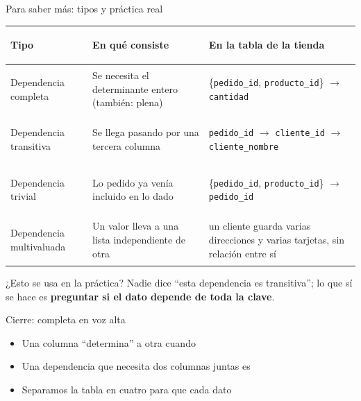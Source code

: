 \documentclass[aspectratio=169,10pt,c]{beamer}
\newcommand{\fdep}{$\rightarrow$}
\newcommand{\bl}[1][1.9cm]{\underline{\hspace{#1}}}
\begin{document}
\begin{frame}{Para saber más: tipos y práctica real\apoyo}
\begin{center}
\footnotesize{}
\begin{tabular}{>{\bfseries\raggedright\arraybackslash}p{2.5cm}>{\raggedright\arraybackslash}p{3.3cm}>{\raggedright\arraybackslash}p{5.3cm}}
\toprule
Tipo & En qué consiste & En la tabla de la tienda \\
\midrule
Dependencia completa & Se necesita el determinante entero \textnormal{(también: plena)} & \{\texttt{pedido\_id}, \texttt{producto\_id}\} \fdep{} \texttt{cantidad} \\[4pt]
Dependencia transitiva & Se llega pasando por una tercera columna & \texttt{pedido\_id} \fdep{} \texttt{cliente\_id} \fdep{} \texttt{cliente\_nombre} \\[4pt]
Dependencia trivial & Lo pedido ya venía incluido en lo dado & \{\texttt{pedido\_id}, \texttt{producto\_id}\} \fdep{} \texttt{pedido\_id} \\[4pt]
Dependencia multivaluada & Un valor lleva a una lista independiente de otra & un cliente guarda varias direcciones y varias tarjetas, sin relación entre sí \\
\bottomrule
\end{tabular}
\end{center}
\vspace{0.25cm}
\begin{block}{¿Esto se usa en la práctica?}
\small Nadie dice ``esta dependencia es transitiva''; lo que sí se hace es \textbf{preguntar si el dato depende de toda la clave}.
\end{block}
\end{frame}

\begin{frame}{Cierre: completa en voz alta}
\begin{itemize}\setlength\itemsep{16pt}
  \item Una columna ``determina'' a otra cuando \bl[5.5cm]
  \item Una dependencia que necesita dos columnas juntas es \bl[4cm]
  \item Separamos la tabla en cuatro para que cada dato \bl[4.5cm]
\end{itemize}
\end{frame}
\end{document}
